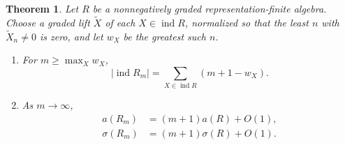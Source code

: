 \documentclass[a4paper,reqno,10pt]{amsart}
\newtheorem{theorem}{Theorem}[section]
\theoremstyle{definition}
\numberwithin{equation}{section}
\DeclareMathOperator{\ind}{ind}
\begin{document}
\begin{theorem}\label{prop:interval-count}
Let \(R\) be a nonnegatively graded representation-finite algebra.
Choose a graded lift \(\widetilde X\) of each \(X\in\ind R\), normalized so that the least
\(n\) with \(\widetilde X_n\ne0\) is zero, and let \(w_X\) be the greatest such
\(n\).
\begin{enumerate}
\item For \(m\geq\max_X w_X\),
\begin{equation}\label{eq:interval-objects}
 |\ind R_m|=\sum_{X\in\ind R}(m+1-w_X).
\end{equation}
\item As \(m\to\infty\),
\begin{align}
 a(R_m)&=(m+1)a(R)+O(1),\label{eq:interval-arrows}\\
 \sigma(R_m)&=(m+1)\sigma(R)+O(1).\label{eq:interval-surplus}
\end{align}
\end{enumerate}
\end{theorem}
\end{document}
